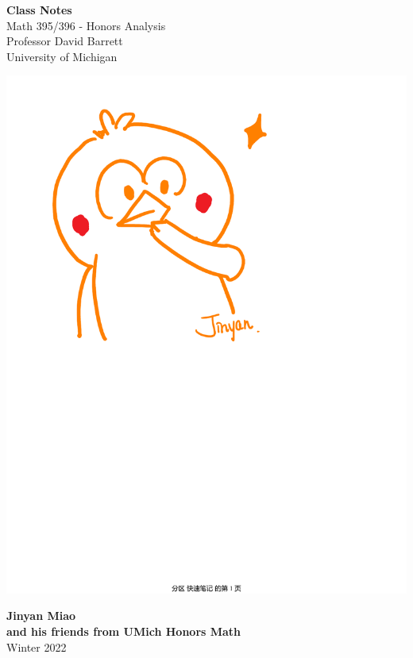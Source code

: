 \documentclass[15pt]{book}
\theoremstyle{break}
\theoremstyle{break}
\begin{document}
	\begin{titlepage}
		\begin{center}
			\vspace*{1cm}
			\Huge \color{red}
				\textbf{Class Notes}\\
			\vspace{0.5cm}			
			\Large \color{black}
				Math 395/396 - Honors Analysis\\
				Professor David Barrett\\	
				University of Michigan\\
			\vspace{2cm}

			\includegraphics[scale=0.5]{hmm.pdf}
			
			
			\vspace{4cm}
			\LARGE
				\textbf{Jinyan Miao}\\
				\large \textbf{and his friends from UMich Honors Math}\\
				\hfill\break
				\LARGE Winter 2022\\
			\vspace{1cm}

		\vspace*{\fill}
		\end{center}			
	\end{titlepage}
\end{document}
